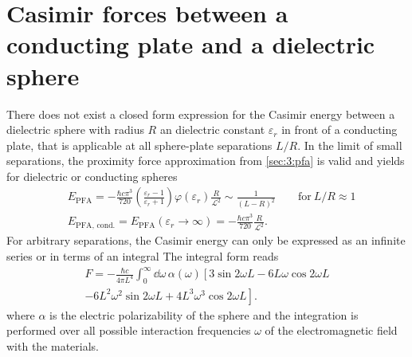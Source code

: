 \section{Casimir forces between a conducting plate and a dielectric sphere} \label{sec:3:casimir-plate-sphere}

There does not exist a closed form expression for the Casimir energy between a dielectric sphere with radius $R$ an dielectric constant $\varepsilon_r$ in front of a conducting plate, that is applicable at all sphere-plate separations $L/R$.
In the limit of small separations, the proximity force approximation from \cref{sec:3:pfa} is valid and yields for dielectric or conducting spheres
\begin{align}\label{eq:3:casimir-sphere-plate-PFA}
  &E_\mathrm{PFA} = -\frac{\hbar c \pi^3}{720} \left(\frac{\varepsilon_r - 1}{\varepsilon_r + 1}\right)\varphi(\varepsilon_r) \frac{R}{\mathscr{L}^2} \sim \frac{1}{(L-R)^2} \quad\quad \text{for}\ L/R \approx 1 \\ \label{eq:3:casimir-sphere-plate-PFA-conducting}
  &E_\mathrm{PFA,\,cond.} = E_\mathrm{PFA}(\varepsilon_r \rightarrow \infty) = -\frac{\hbar c \pi^3}{720} \frac{R}{\mathscr{L}^2} .
\end{align}
For arbitrary separations, the Casimir energy can only be expressed as an infinite series \cite{Emig_2007,Emig_2007a} or in terms of an integral \cite{Ford_1998}
The integral form reads
\begin{multline}\label{eq:3:ford-integral}
  F = - \frac{\hbar c}{4 \pi L^4} \int_{0}^{\infty} \dd \omega \, \alpha(\omega) \left[3\sin 2 \omega L - 6L\omega \cos 2 \omega L \right. \\ 
  \left. - 6L^2\omega^2 \sin 2 \omega L + 4L^3\omega^3 \cos 2 \omega L\right].
\end{multline}
where $\alpha$ is the electric polarizability of the sphere and the integration is performed over all possible interaction frequencies $\omega$ of the electromagnetic field with the materials.

